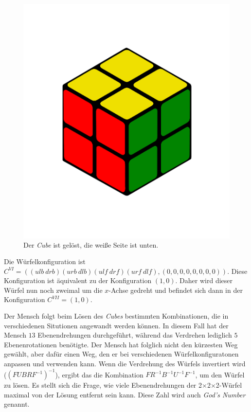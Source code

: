 \documentclass[12pt,a4paper, usenames, dvipsnames]{article}
\theoremstyle{mystyle}
\theoremstyle{definition}
\newcommand{\Ttwo}{2$\times$2$\times$2-}
\begin{document}
\begin{figure}[H]
\centering
\includegraphics[scale=0.12]{menschSchritt5.png}
\caption[Lösung von Mensch: Schritt 5]{Der \textit{Cube} ist gelöst, die weiße Seite ist unten.}
\label{Abbildung_LösungMensch5}
\end{figure} 

Die Würfelkonfiguration ist $ C^{VI} = (( \textit{ulb} \ \textit{drb} )( \textit{urb} \ \textit{dlb} )( \textit{ulf} \ \textit{drf} )( \textit{urf} \ \textit{dlf} ), (0,0,0,0,0,0,0,0))$. Diese Konfiguration ist äquivalent zu der Konfiguration $(1,0)$.
Daher wird dieser Würfel nun noch zweimal um die $x$-Achse gedreht und befindet sich dann in der Konfiguration $C^{VII} =(1,0)$.

Der Mensch folgt beim Lösen des \textit{Cubes} bestimmten Kombinationen, die in verschiedenen Situtionen angewandt werden können.  
In diesem Fall hat der Mensch $13$ Ebenendrehungen durchgeführt, während das Verdrehen lediglich $5$ Ebenenrotationen benötigte. Der Mensch hat folglich nicht den kürzesten Weg gewählt, aber dafür einen Weg, den er bei verschiedenen Würfelkonfiguratonen anpassen und verwenden kann. 
Wenn die Verdrehung des Würfels invertiert wird ($(FUBRF^{-1})^{-1}$), ergibt das die Kombination $FR^{-1}B^{-1}U^{-1}F^{-1}$, um den Würfel zu lösen.
Es stellt sich die Frage, wie viele Ebenendrehungen der \Ttwo Würfel maximal von der Lösung entfernt sein kann. Diese Zahl wird auch \textit{God's Number} genannt. 
\end{document}
